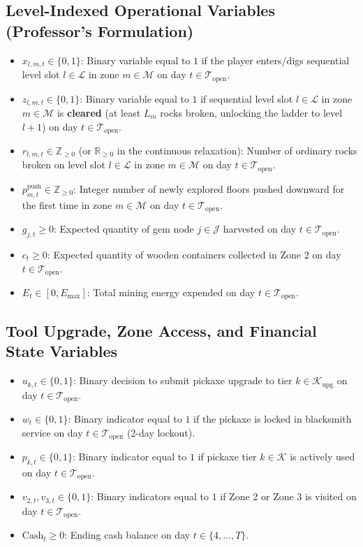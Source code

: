 \documentclass[11pt,a4paper]{article}
\begin{document}
\subsection{Level-Indexed Operational Variables (Professor's Formulation)}
\begin{itemize}
    \item $x_{l,m,t} \in \{0, 1\}$: Binary variable equal to $1$ if the player enters/digs sequential level slot $l \in \mathcal{L}$ in zone $m \in \mathcal{M}$ on day $t \in \mathcal{T}_{\text{open}}$.
    \item $z_{l,m,t} \in \{0, 1\}$: Binary variable equal to $1$ if sequential level slot $l \in \mathcal{L}$ in zone $m \in \mathcal{M}$ is \textbf{cleared} (at least $L_m$ rocks broken, unlocking the ladder to level $l+1$) on day $t \in \mathcal{T}_{\text{open}}$.
    \item $r_{l,m,t} \in \mathbb{Z}_{\ge 0}$ (or $\mathbb{R}_{\ge 0}$ in the continuous relaxation): Number of ordinary rocks broken on level slot $l \in \mathcal{L}$ in zone $m \in \mathcal{M}$ on day $t \in \mathcal{T}_{\text{open}}$.
    \item $p_{m,t}^{\text{push}} \in \mathbb{Z}_{\ge 0}$: Integer number of newly explored floors pushed downward for the first time in zone $m \in \mathcal{M}$ on day $t \in \mathcal{T}_{\text{open}}$.
    \item $g_{j,t} \ge 0$: Expected quantity of gem node $j \in \mathcal{J}$ harvested on day $t \in \mathcal{T}_{\text{open}}$.
    \item $c_t \ge 0$: Expected quantity of wooden containers collected in Zone 2 on day $t \in \mathcal{T}_{\text{open}}$.
    \item $E_t \in [0, E_{\max}]$: Total mining energy expended on day $t \in \mathcal{T}_{\text{open}}$.
\end{itemize}

\subsection{Tool Upgrade, Zone Access, and Financial State Variables}
\begin{itemize}
    \item $u_{k,t} \in \{0, 1\}$: Binary decision to submit pickaxe upgrade to tier $k \in \mathcal{K}_{\text{upg}}$ on day $t \in \mathcal{T}_{\text{open}}$.
    \item $w_t \in \{0, 1\}$: Binary indicator equal to $1$ if the pickaxe is locked in blacksmith service on day $t \in \mathcal{T}_{\text{open}}$ (2-day lockout).
    \item $p_{k,t} \in \{0, 1\}$: Binary indicator equal to $1$ if pickaxe tier $k \in \mathcal{K}$ is actively used on day $t \in \mathcal{T}_{\text{open}}$.
    \item $v_{2,t}, v_{3,t} \in \{0, 1\}$: Binary indicators equal to $1$ if Zone 2 or Zone 3 is visited on day $t \in \mathcal{T}_{\text{open}}$.
    \item $\text{Cash}_t \ge 0$: Ending cash balance on day $t \in \{4, \dots, T\}$.
\end{itemize}
\end{document}
